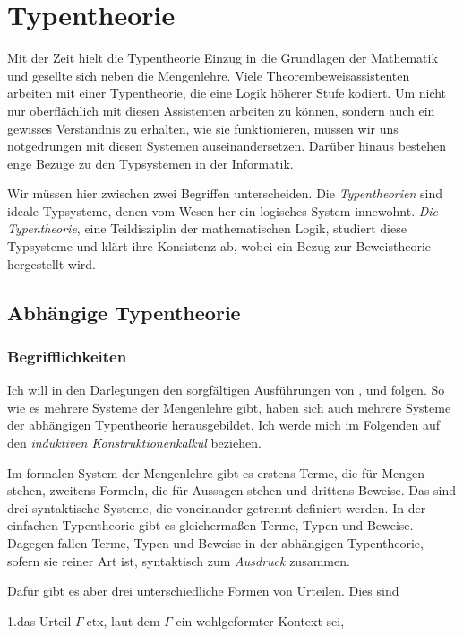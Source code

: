 
\chapter{Typentheorie}

Mit der Zeit hielt die Typentheorie Einzug in die Grundlagen der Mathematik
und gesellte sich neben die Mengenlehre. Viele Theorembeweisassistenten
arbeiten mit einer Typentheorie, die eine Logik höherer Stufe kodiert.
Um nicht nur oberflächlich mit diesen Assistenten arbeiten zu können, sondern
auch ein gewisses Verständnis zu erhalten, wie sie funktionieren, müssen wir
uns notgedrungen mit diesen Systemen auseinandersetzen. Darüber hinaus
bestehen enge Bezüge zu den Typsystemen in der Informatik.

Wir müssen hier zwischen zwei Begriffen unterscheiden. Die \emph{Typentheorien}
sind ideale Typsysteme, denen vom Wesen her ein logisches System innewohnt.
\emph{Die Typentheorie}, eine Teildisziplin der mathematischen Logik, studiert
diese Typsysteme und klärt ihre Konsistenz ab, wobei ein Bezug zur
Beweistheorie hergestellt wird.

\section{Abhängige Typentheorie}

\subsection{Begrifflichkeiten}

Ich will in den Darlegungen den sorgfältigen Ausführungen von
\cite{Avigad}, \cite{Mimram} und \cite{HoTT} folgen. So wie es mehrere
Systeme der Mengenlehre gibt, haben sich auch mehrere Systeme der
abhängigen Typentheorie herausgebildet. Ich werde mich im Folgenden
auf den \emph{induktiven Konstruktionenkalkül} beziehen.

Im formalen System der Mengenlehre gibt es erstens Terme, die für Mengen
stehen, zweitens Formeln, die für Aussagen stehen und drittens Beweise.
Das sind drei syntaktische Systeme, die voneinander getrennt definiert
werden. In der einfachen Typentheorie gibt es gleichermaßen Terme, Typen und
Beweise. Dagegen fallen Terme, Typen und Beweise in der abhängigen
Typentheorie, sofern sie reiner Art ist, syntaktisch zum \emph{Ausdruck}
zusammen.

Dafür gibt es aber drei unterschiedliche Formen von Urteilen.%
 Dies sind

1.\;das Urteil $\Gamma\;\mathrm{ctx}$, laut dem $\Gamma$ ein
wohlgeformter Kontext sei,

